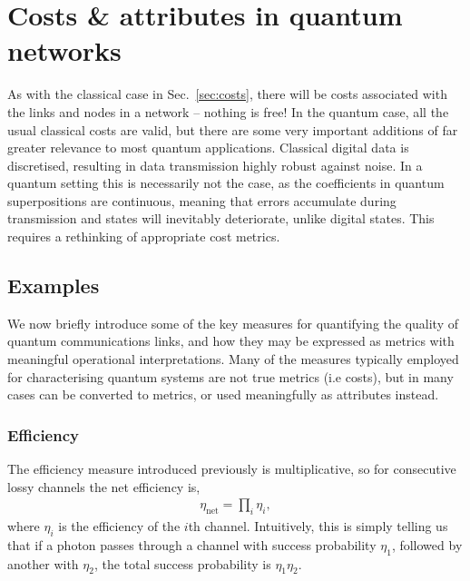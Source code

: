 \documentclass[aps, rmp, twocolumn, amsmath, amssymb, nofootinbib, superscriptaddress, longbibliography, floatfix, table-of-contents, eqsecnum]{revtex4-1}
\begin{document}
%
%

\section{Costs \& attributes in quantum networks} \label{sec:quantum_meas_cost}
As with the classical case in Sec.~\ref{sec:costs}, there will be costs associated with the links and nodes in a network -- nothing is free! In the quantum case, all the usual classical costs are valid, but there are some very important additions of far greater relevance to most quantum applications. Classical digital data is discretised, resulting in data transmission highly robust against noise. In a quantum setting this is necessarily not the case, as the coefficients in quantum superpositions are continuous, meaning that errors accumulate during transmission and states will inevitably deteriorate, unlike digital states. This requires a rethinking of appropriate cost metrics.

%
%

\subsection{Examples}

We now briefly introduce some of the key measures for quantifying the quality of quantum communications links, and how they may be expressed as metrics with meaningful operational interpretations. Many of the measures typically employed for characterising quantum systems are not true metrics (i.e costs), but in many cases can be converted to metrics, or used meaningfully as attributes instead.

%
%

\subsubsection{Efficiency} 

The efficiency measure introduced previously is multiplicative, so for consecutive lossy channels the net efficiency is,
\begin{align}
\eta_\text{net}=\prod_i \eta_i,
\end{align}
where $\eta_i$ is the efficiency of the $i$th channel. Intuitively, this is simply telling us that if a photon passes through a channel with success probability $\eta_1$, followed by another with $\eta_2$, the total success probability is \mbox{$\eta_1\eta_2$}.
\end{document}
